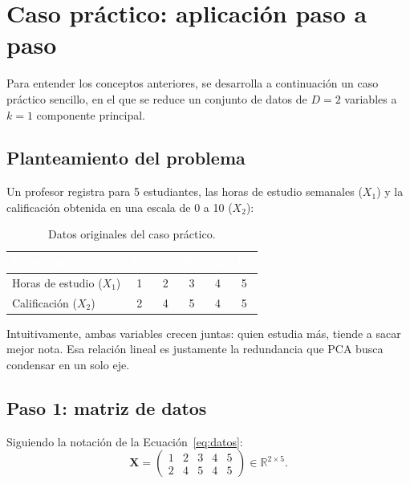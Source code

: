 \documentclass[11pt,letterpaper]{article}
\begin{document}
	\newpage
	
	\section{Caso práctico: aplicación paso a paso}
	
	Para entender los conceptos anteriores, se desarrolla a continuación un caso práctico sencillo, en el que se reduce un conjunto de datos de $D=2$ variables a $k=1$ componente principal.
	
	\subsection{Planteamiento del problema}
	
	Un profesor registra para 5 estudiantes, las horas de estudio semanales ($X_1$) y la calificación obtenida en una escala de 0 a 10 ($X_2$):
	
	\begin{table}[h!]
		\centering
		\caption{Datos originales del caso práctico.}
		\label{tab:datos-caso}
		\begin{tabular}{@{}lccccc@{}}
			\toprule
			\rowcolor{accent!85}
			\textcolor{white}{\textbf{Estudiante}} & \textcolor{white}{E1} & \textcolor{white}{E2} & \textcolor{white}{E3} & \textcolor{white}{E4} & \textcolor{white}{E5} \\
			\midrule
			Horas de estudio ($X_1$) & 1 & 2 & 3 & 4 & 5 \\
			Calificación ($X_2$)     & 2 & 4 & 5 & 4 & 5 \\
			\bottomrule
		\end{tabular}
	\end{table}
	
	Intuitivamente, ambas variables crecen juntas: quien estudia más, tiende a sacar mejor nota. Esa relación lineal es justamente la redundancia que PCA busca condensar en un solo eje.
	
	\subsection{Paso 1: matriz de datos}
	
	Siguiendo la notación de la Ecuación~\eqref{eq:datos}:
	\[
	\mathbf{X} = \begin{pmatrix} 1 & 2 & 3 & 4 & 5 \\ 2 & 4 & 5 & 4 & 5 \end{pmatrix} \in \mathbb{R}^{2\times 5}.
	\]
	
\end{document}
